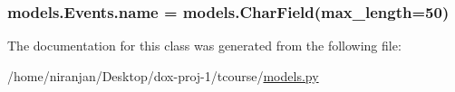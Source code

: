 \subsubsection[{\texorpdfstring{name}{name}}]{\setlength{\rightskip}{0pt plus 5cm}models.\+Events.\+name = models.\+Char\+Field(max\+\_\+length=50)\hspace{0.3cm}{\ttfamily [static]}}\hypertarget{classmodels_1_1_events_ae52223e512507d0807e70f52a424fe4a}{}\label{classmodels_1_1_events_ae52223e512507d0807e70f52a424fe4a}


The documentation for this class was generated from the following file\+:\begin{DoxyCompactItemize}
\item 
/home/niranjan/\+Desktop/dox-\/proj-\/1/tcourse/\hyperlink{models_8py}{models.\+py}\end{DoxyCompactItemize}
